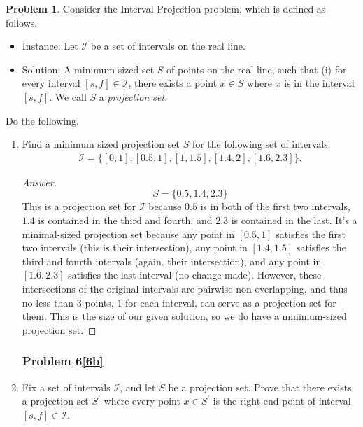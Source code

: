 \documentclass[11pt]{article}
\theoremstyle{definition}
\theoremstyle{definition}
\newtheorem{required}{Problem}
\theoremstyle{definition}
\begin{document}
\begin{required} \label{Exchange2}
Consider the \textsf{Interval Projection} problem, which is defined as follows.
\begin{itemize}
\item \textsf{Instance:} Let $\mathcal{I}$ be a set of intervals on the real line.
\item \textsf{Solution:} A minimum sized set $S$ of points on the real line, such that (i) for every interval $[s, f] \in \mathcal{I}$, there exists a point $x \in S$ where $x$ is in the interval $[s, f]$. We call $S$ a \textit{projection set}.
\end{itemize}

\noindent Do the following.
\begin{enumerate}[label=(\alph*)]
\subsubsection{Problem 6\ref{6a}}
\item \label{6a} Find a minimum sized projection set $S$ for the following set of intervals:
\begin{align*}
\mathcal{I} = \{ [0, 1], [0.5, 1], [1, 1.5], [1.4, 2], [1.6, 2.3] \}.
\end{align*}


\begin{proof}[Answer]
\[
	S = \{ 0.5, 1.4, 2.3 \}	
\]
This is a projection set for $\mathcal{I}$ because $0.5$ is in both of the first two intervals, $1.4$ is contained in the third and fourth, and 2.3 is contained in 
the last. It's a minimal-sized projection set because any point in $[0.5, 1]$ satisfies the first two intervals (this is their intersection), any point in $[1.4, 1.5]$ satisfies the third and fourth intervals (again, their intersection), and any point in $[1.6, 2.3]$ satisfies the last interval (no change made).
However, these intersections of the original intervals are pairwise non-overlapping, and thus no less than $3$ points, $1$ for each interval, can serve as a projection set for them. This is the size of our given solution, so we do have a minimum-sized projection set. 

\end{proof}

\newpage
\subsubsection{Problem 6\ref{6b}}
\item \label{6b} Fix a set of intervals $\mathcal{I}$, and let $S$ be a projection set. Prove that there exists a projection set $S^{\prime}$ where every point $x \in S^{\prime}$ is the right end-point of interval $[s, f] \in \mathcal{I}$. 


\end{enumerate}
\end{required}
\end{document}
